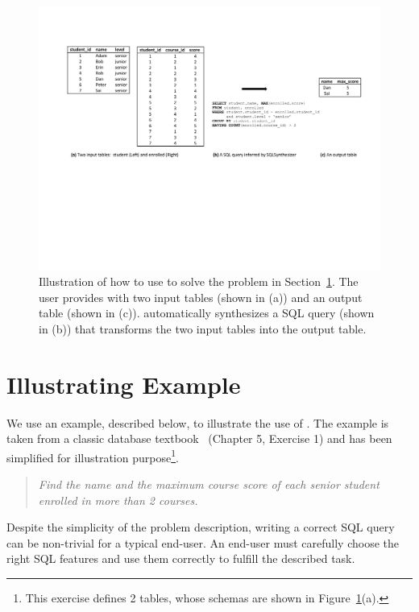 
\begin{figure}[t]
  \centering
  \includegraphics[scale=0.73]{motivating}
  \vspace*{-2.0ex}\caption {{\label{fig:motivating}
  Illustration of how to use \ourtool to solve the problem in Section~\ref{sec:example}.
  The user provides \ourtool with
  two input tables (shown in (a)) and an output table (shown in (c)).
  \ourtool automatically synthesizes a SQL query (shown in (b)) that
  transforms the two input tables into the output table.
}}
\vspace{-1mm}
\end{figure}

\section{Illustrating Example}
\label{sec:example}

\vspace{-1mm}

We use an example, described below, to illustrate the use
of \ourtool. The example is taken from a classic
database textbook~\cite{cowbook} (Chapter 5, Exercise 1)
and has been simplified for illustration purpose\footnote{
This exercise defines 2 tables, whose
schemas are shown in Figure~\ref{fig:motivating}(a).}.

\begin{quote}
\textit{Find the name and the maximum course score of each senior student
enrolled in more than 2 courses.}
\end{quote}

Despite the simplicity of the problem description,
writing a correct SQL query  can be non-trivial for a typical
end-user. An end-user must carefully choose the
right SQL features and use them correctly
to fulfill the described task.

